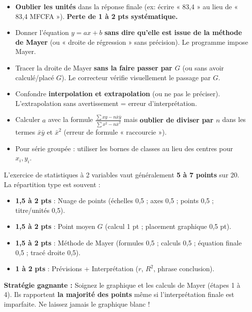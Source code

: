 \documentclass[11pt]{article}
\begin{document}
\begin{attention}
\begin{itemize}
    \item \textbf{Oublier les unités} dans la réponse finale (ex: écrire « 83,4 » au lieu de « 83,4 MFCFA »). \textbf{Perte de 1 à 2 pts systématique.}
    \item Donner l'équation $y = ax + b$ \textbf{sans dire qu'elle est issue de la méthode de Mayer} (ou « droite de régression » sans précision). Le programme impose Mayer.
    \item Tracer la droite de Mayer \textbf{sans la faire passer par $G$} (ou sans avoir calculé/placé $G$). Le correcteur vérifie visuellement le passage par $G$.
    \item Confondre \textbf{interpolation et extrapolation} (ou ne pas le préciser). L'extrapolation sans avertissement = erreur d'interprétation.
    \item Calculer $a$ avec la formule $\frac{\sum xy - n\bar{x}\bar{y}}{\sum x^2 - n\bar{x}^2}$ mais \textbf{oublier de diviser par $n$} dans les termes $\bar{x}\bar{y}$ et $\bar{x}^2$ (erreur de formule « raccourcie »).
    \item Pour série groupée : utiliser les bornes de classes au lieu des centres pour $x_i, y_i$.
\end{itemize}
\end{attention}

\begin{savaistu}
L'exercice de statistiques à 2 variables vaut généralement \textbf{5 à 7 points} sur 20.
La répartition type est souvent :
\begin{itemize}
    \item \textbf{1,5 à 2 pts} : Nuage de points (échelles 0,5 ; axes 0,5 ; points 0,5 ; titre/unités 0,5).
    \item \textbf{1,5 à 2 pts} : Point moyen $G$ (calcul 1 pt ; placement graphique 0,5 pt).
    \item \textbf{1,5 à 2 pts} : Méthode de Mayer (formules 0,5 ; calculs 0,5 ; équation finale 0,5 ; tracé droite 0,5).
    \item \textbf{1 à 2 pts} : Prévisions + Interprétation ($r$, $R^2$, phrase conclusion).
\end{itemize}
\textbf{Stratégie gagnante :} Soignez le graphique et les calculs de Mayer (étapes 1 à 4). Ils rapportent \textbf{la majorité des points} même si l'interprétation finale est imparfaite. Ne laissez jamais le graphique blanc !
\end{savaistu}
\end{document}
